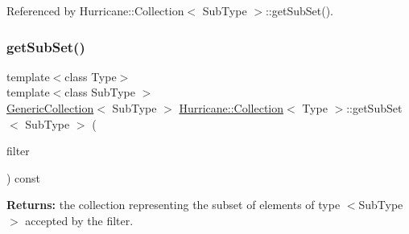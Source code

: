 Referenced by Hurricane\+::\+Collection$<$ Sub\+Type $>$\+::get\+Sub\+Set().

\mbox{\label{classHurricane_1_1Collection_a673afd14782da82ad03a68366ae1f09b}} 
\subsubsection{\texorpdfstring{get\+Sub\+Set()}{getSubSet()}\hspace{0.1cm}{\footnotesize\ttfamily [3/3]}}
{\footnotesize\ttfamily template$<$class Type$>$ \\
template$<$class Sub\+Type $>$ \\
\hyperlink{classHurricane_1_1GenericCollection}{Generic\+Collection}$<$ Sub\+Type $>$ \hyperlink{classHurricane_1_1Collection}{Hurricane\+::\+Collection}$<$ Type $>$\+::get\+Sub\+Set$<$ Sub\+Type $>$ (\begin{DoxyParamCaption}\item[{const \hyperlink{classHurricane_1_1Filter}{Filter}$<$ Sub\+Type $>$ \&}]{filter }\end{DoxyParamCaption}) const\hspace{0.3cm}{\ttfamily [inline]}}

{\bfseries Returns\+:} the collection representing the subset of elements of type {\ttfamily $<$Sub\+Type$>$} accepted by the filter.


